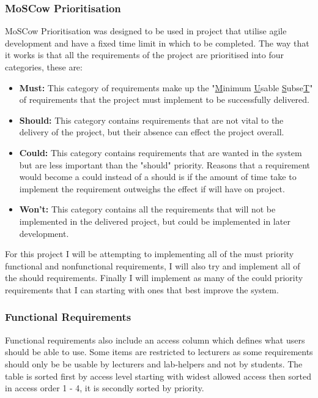 \documentclass[12pt]{article}  %
\begin{document}
\subsubsection{MoSCow Prioritisation}
\label{sec:moscow}

MoSCow Prioritisation \cite{noauthor_moscow_2015} was designed to be used in project that utilise agile development and have a fixed time limit in which to be completed. The way that it works is that all the requirements of the project are prioritised into four categories, these are:

\begin{itemize}

\item \textbf{Must:} This category of requirements make up the "\underline{M}inimum \underline{U}sable \underline{S}ubse\underline{T}" of requirements that the project must implement to be successfully delivered.

\item \textbf{Should:} This category contains requirements that are not vital to the delivery of the project, but their absence can effect the project overall. 

\item \textbf{Could:} This category contains requirements that are wanted in the system but are less important than the "should" priority. Reasons that a requirement would become a could instead of a should is if the amount of time take to implement the requirement outweighs the effect if will have on project.   

\item \textbf{Won't:} This category contains all the requirements that will not be implemented in the delivered project, but could be implemented in later development.
\end{itemize}

\noindent For this project I will be attempting to implementing all of the must priority functional and nonfunctional requirements, I will also try and implement all of the should requirements. Finally I will implement as many of the could priority requirements that I can starting with ones that best improve the system.


\def\arraystretch{1.5}
\subsubsection{Functional Requirements} \label{sec:func}

Functional requirements also include an access column which defines what users should be able to use. Some items are restricted to lecturers as some requirements should only be be usable by lecturers and lab-helpers and not by students. The table is sorted first by access level starting with widest allowed access then sorted in access order 1 - 4, it is secondly sorted by priority.
\end{document}
